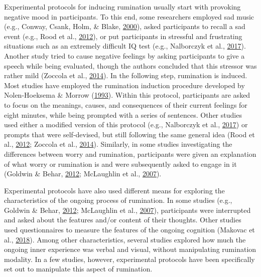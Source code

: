 \documentclass[a4paper,12pt,twoside,openright,oldfontcommands]{memoir}
\begin{document}
Experimental protocols for inducing rumination usually start with provoking negative mood in participants. To this end, some researchers employed sad music (e.g., Conway, Csank, Holm, \& Blake, \protect\hyperlink{ref-conway_assessing_2000}{2000}), asked participants to recall a sad event (e.g., Rood et al., \protect\hyperlink{ref-Rood2012}{2012}), or put participants in stressful and frustrating situations such as an extremely difficult IQ test (e.g., Nalborczyk et al., \protect\hyperlink{ref-nalborczyk_orofacial_2017}{2017}). Another study tried to cause negative feelings by asking participants to give a speech while being evaluated, though the authors concluded that this stressor was rather mild (Zoccola et al., \protect\hyperlink{ref-zoccola_cardiovascular_2014}{2014}). In the following step, rumination is induced. Most studies have employed the rumination induction procedure developed by Nolen-Hoeksema \& Morrow (\protect\hyperlink{ref-nolen-hoeksema_effects_1993}{1993}). Within this protocol, participants are asked to focus on the meanings, causes, and consequences of their current feelings for eight minutes, while being prompted with a series of sentences. Other studies used either a modified version of this protocol (e.g., Nalborczyk et al., \protect\hyperlink{ref-nalborczyk_orofacial_2017}{2017}) or prompts that were self-devised, but still following the same general idea (Rood et al., \protect\hyperlink{ref-Rood2012}{2012}; Zoccola et al., \protect\hyperlink{ref-zoccola_cardiovascular_2014}{2014}). Similarly, in some studies investigating the differences between worry and rumination, participants were given an explanation of what worry or rumination is and were subsequently asked to engage in it (Goldwin \& Behar, \protect\hyperlink{ref-goldwin_concreteness_2012}{2012}; McLaughlin et al., \protect\hyperlink{ref-mclaughlin_effects_2007}{2007}).

Experimental protocols have also used different means for exploring the characteristics of the ongoing process of rumination. In some studies (e.g., Goldwin \& Behar, \protect\hyperlink{ref-goldwin_concreteness_2012}{2012}; McLaughlin et al., \protect\hyperlink{ref-mclaughlin_effects_2007}{2007}), participants were interrupted and asked about the features and/or content of their thoughts. Other studies used questionnaires to measure the features of the ongoing cognition (Makovac et al., \protect\hyperlink{ref-makovac_verbal_2018}{2018}). Among other characteristics, several studies explored how much the ongoing inner experience was verbal and visual, without manipulating rumination modality. In a few studies, however, experimental protocols have been specifically set out to manipulate this aspect of rumination.
\end{document}
